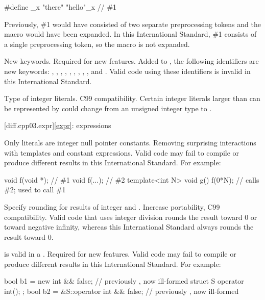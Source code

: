 \begin{codeblock}
#define _x "there"
"hello"_x         // \#1
\end{codeblock}

Previously, \#1 would have consisted of two separate preprocessing tokens and
the macro  would have been expanded. In this International Standard,
\#1 consists of a single preprocessing token, so the macro is not expanded.

\change New keywords.
\rationale Required for new features.
\effect
Added to , the following identifiers are new keywords:
,
,
,
,
,
,
,
,
,
and
.
Valid \CppIII{} code using these identifiers is invalid in this International
Standard.

\change Type of integer literals.
\rationale C99 compatibility.
\effect
Certain integer literals larger than can be represented by  could
change from an unsigned integer type to .

[diff.cpp03.expr]{\ref{expr}: expressions}

\change Only literals are integer null pointer constants.
\rationale Removing surprising interactions with templates and constant
expressions.
\effect Valid \CppIII{} code may fail to compile or produce different results in
this International Standard.
For example:

\begin{codeblock}
void f(void *);  // \#1
void f(...);     // \#2
template<int N> void g() {
  f(0*N);        // calls \#2; used to call \#1
}
\end{codeblock}

\change Specify rounding for results of integer \tcode{/} and \tcode{\%}.
\rationale Increase portability, C99 compatibility.
\effect
Valid \CppIII{} code that uses integer division rounds the result toward 0 or
toward negative infinity, whereas this International Standard always rounds
the result toward 0.

\change \tcode{\&\&} is valid in a .
\rationale Required for new features.
\effect
Valid \CppIII{} code may fail to compile or produce different results in
this International Standard.
For example:

\begin{codeblock}
bool b1 = new int && false;           // previously , now ill-formed
struct S { operator int(); };
bool b2 = &S::operator int && false;  // previously , now ill-formed
\end{codeblock}

